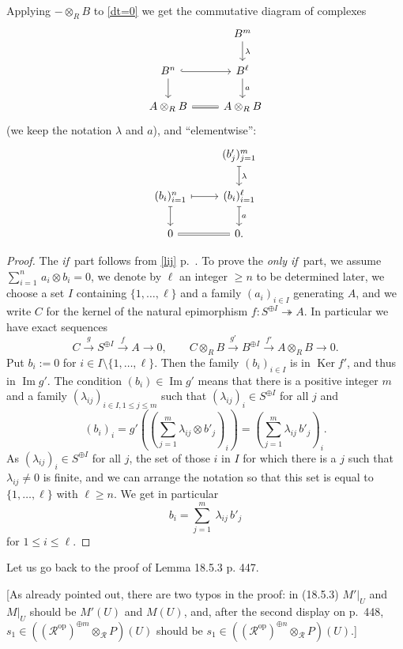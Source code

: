 \documentclass[12pt]{article}%
\theoremstyle{remark}
\theoremstyle{definition}
\newcommand{\cc}{\mathcal}
\newcommand{\epi}{\twoheadrightarrow}
\newcommand{\xr}{\xrightarrow}
\DeclareMathOperator{\Ima}{Im}
\DeclareMathOperator{\Ker}{Ker}
\DeclareMathOperator{\op}{op}
\begin{document}
Applying $-\otimes_RB$ to \eqref{dt=0} we get the commutative diagram of complexes
%
\begin{equation*}
\begin{tikzcd}
{}&B^m\ar{d}{\lambda}\\ 
B^n\ar[hook]{r}\ar{d}&B^\ell\ar{d}{a}\\ 
A\otimes_RB\ar[equal]{r}&A\otimes_RB
\end{tikzcd}
\end{equation*}
%
(we keep the notation $\lambda$ and $a$), and ``elementwise'':
%
\begin{equation}\label{eltwise}
\begin{tikzcd}
{}&(b'_j)_{j=1}^m\ar[mapsto]{d}{\lambda}\\ 
(b_i)_{i=1}^n\ar[mapsto]{r}\ar[mapsto]{d}&(b_i)_{i=1}^\ell\ar[mapsto]{d}{a}\\ 
0\ar[equal]{r}&0.
\end{tikzcd}
\end{equation}
%
\begin{proof}
The {\em if}\ part follows from \eqref{lij} p.~\pageref{lij}. To prove the {\em only if}\ part, we assume $\sum_{i=1}^n\,a_i\otimes b_i=0$, we denote by $\ell$ an integer $\ge n$ to be determined later, we choose a set $I$ containing $\{1,\dots,\ell\}$ and a family $(a_i)_{i\in I}$ generating $A$, and we write $C$ for the kernel of the natural epimorphism $f:S^{\oplus I}\epi A$. In particular we have exact sequences 
$$
C\xr gS^{\oplus I}\xr fA\to0,\qquad C\otimes_RB\xr{g'}B^{\oplus I}\xr{f'}A\otimes_RB\to0.
$$ 
Put $b_i:=0$ for $i\in I\setminus\{1,\dots,\ell\}$. Then the family $(b_i)_{i\in I}$ is in $\Ker f'$, and thus in $\Ima g'$. The condition $(b_i)\in\Ima g'$ means that there is a positive integer $m$ and a family $(\lambda_{ij})_{i\in I,1\le j\le m}$ such that $(\lambda_{ij})_i\in S^{\oplus I}$ for all $j$ and 
$$
(b_i)_i=g'
\left(\left(\sum_{j=1}^m\lambda_{ij}\otimes b'_j\right)_i\right)=
\left(\sum_{j=1}^m\lambda_{ij}\,b'_j\right)_i.
$$ 
As $(\lambda_{ij})_i\in S^{\oplus I}$ for all $j$, the set of those $i$ in $I$ for which there is a $j$ such that $\lambda_{ij}\neq0$ is finite, and we can arrange the notation so that this set is equal to $\{1,\dots,\ell\}$ with $\ell\ge n$. We get in particular  
$$
b_i=\sum_{j=1}^m\ \lambda_{ij}\,b'_j
$$ 
for $1\le i\le\ell$.
\end{proof}
%
Let us go back to the proof of Lemma 18.5.3 p. 447.

[As already pointed out, there are two typos in the proof: in (18.5.3) $M'|_U$ and $M|_U$ should be $M'(U)$ and $M(U)$, and, after the second display on p.~448, $s_1\in((\cc R^{\op})^{\oplus m}\otimes_{\cc R}P)(U)$ should be $s_1\in((\cc R^{\op})^{\oplus n}\otimes_{\cc R}P)(U)$.]
\end{document}

